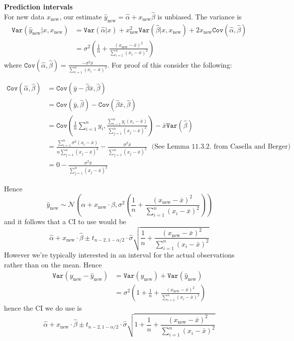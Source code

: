 \documentclass{article}
\begin{document}

\textbf{Prediction intervals}\\
For new data $x_{\text{new}}$, our estimate $\hat{y}_{\text{new}} = \hat{\alpha} + x_{\text{new}} \hat{\beta}$
is unbiased. The variance is
\begin{align*}
  \mathtt{Var}(\hat{y}_\text{new} | x, x_{\text{new}}) &= \mathtt{Var}(\hat{\alpha} | x)  + x_\text{new}^2 \mathtt{Var}(\hat{\beta} | x, x_{\text{new}})  + 2 x_{\text{new}} \mathtt{Cov}(\hat{\alpha}, \hat{\beta})\\
  &= \sigma^2 \left(\frac{1}{n} + \frac{(x_\text{new} - \bar{x})^2}{\sum_{i=1}^{n}(x_i - \bar{x})^2}\right)
\end{align*}
where $\mathtt{Cov}(\hat{\alpha}, \hat{\beta}) = \frac{-\sigma^2\bar{x}}{\sum_{i=1}^{n}(x_i - \bar{x})^2}$. For proof of this
consider the following:

\begin{align*}
  \mathtt{Cov}(\hat{\alpha}, \hat{\beta}) &= \mathtt{Cov}(\bar{y} - \hat{\beta}\bar{x}, \hat{\beta})\\
  &= \mathtt{Cov}(\bar{y}, \hat{\beta}) -  \mathtt{Cov}(\hat{\beta} \bar{x}, \hat{\beta})\\
  &= \mathtt{Cov}\left(\frac{1}{n} \sum_{i=1}^{n} y_i, \frac{\sum_{i=1}^{n}y_i (x_i - \bar{x})}{\sum_{j=1}^{n} (x_j - \bar{x})^2} \right) -  \bar{x} \mathtt{Var}(\hat{\beta}) \\
  &= \frac{\sum_{i=1}^{n}\sigma^2 (x_i - \bar{x})}{n\sum_{j=1}^{n} (x_j - \bar{x})^2} -  \frac{\sigma^2 \bar{x}}{\sum_{j=1}^{n} (x_j - \bar{x})^2} \ \ \ \text{(See Lemma 11.3.2. from Casella and Berger)} \\
  &= 0 -  \frac{\sigma^2 \bar{x}}{\sum_{j=1}^{n} (x_j - \bar{x})^2}
\end{align*}

Hence
\[ \hat{y}_\text{new} \sim \mathcal{N}\left(\alpha + x_\text{new} \cdot \beta, \sigma^2 \left( \frac{1}{n} + \frac{(x_\text{new} - \bar{x})^2}{\sum_{i=1}^{n}(x_i - \bar{x})^2}\right)\right) \]
and it follows that a CI to use would be
\[\hat{\alpha} + x_\text{new} \cdot \hat{\beta} \pm t_{n-2, 1 - \alpha/2} \cdot \hat{\sigma} \sqrt{\frac{1}{n} + \frac{(x_\text{new} - \bar{x})^2}{\sum_{i=1}^{n}(x_i - \bar{x})^2}}\]
However we're typically interested in an interval for the actual observations rather than on the mean. Hence
\begin{align*}
  \mathtt{Var}(y_\text{new} - \hat{y}_\text{new}) &= \mathtt{Var}(y_\text{new}) + \mathtt{Var}(\hat{y}_\text{new}) \\
  &= \sigma^2 \left( 1+ \frac{1}{n} + \frac{(x_\text{new} - \bar{x})^2}{\sum_{i=1}^{n}(x_i - \bar{x})^2}\right)
\end{align*}
hence the CI we do use is
\[\hat{\alpha} + x_\text{new} \cdot \hat{\beta} \pm t_{n-2, 1 - \alpha/2} \cdot \hat{\sigma} \sqrt{1 + \frac{1}{n} + \frac{(x_\text{new} - \bar{x})^2}{\sum_{i=1}^{n}(x_i - \bar{x})^2}}\]
\end{document}
